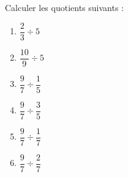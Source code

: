 
\begin{exercice}\label{exo2smath-0030}

    Calculer les quotients suivants :
    \begin{multicols}{3}
        \begin{enumerate}
            \item
                \( \dfrac{ 2 }{ 3 }\div 5\)
            \item
                \( \dfrac{ 10 }{ 9 }\div 5\)
            \item
                \( \dfrac{ 9 }{ 7 }\div\dfrac{ 1 }{ 5 }\)
            \item
                \( \dfrac{ 9 }{ 7 }\div\dfrac{ 3 }{ 5 }\)
            \item
                \( \dfrac{ 9 }{ 7 }\div\dfrac{ 1 }{ 7 }\)
            \item
                \( \dfrac{ 9 }{ 7 }\div\dfrac{ 2 }{ 7 }\)
        \end{enumerate}
    \end{multicols}

\end{exercice}
